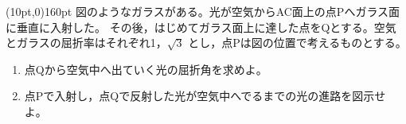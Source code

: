 \hakosyokika
\item
    \begin{mawarikomi}(10pt,0){160pt}{}
    図のようなガラスがある。光が空気からAC面上の点Pへガラス面に垂直に入射した。
    その後，はじめてガラス面上に達した点をQとする。空気とガラスの屈折率はそれぞれ1，$\sqrt{3}$
    とし，点Pは図の位置で考えるものとする。
        \begin{enumerate}
            \item 点Qから空気中へ出ていく光の屈折角を求めよ。
            \item 点Pで入射し，点Qで反射した光が空気中へでるまでの光の進路を図示せよ。
        \end{enumerate}
    \end{mawarikomi}